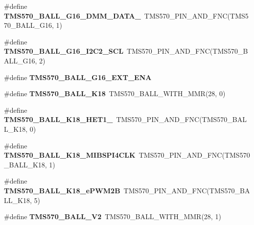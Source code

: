 \begin{DoxyCompactItemize}
\mbox{\label{tms570lc4357-pins_8h_aa8bcd263fff0731b16ca808d747d9d55}} 
\#define {\bfseries T\+M\+S570\+\_\+\+B\+A\+L\+L\+\_\+\+G16\+\_\+\+D\+M\+M\+\_\+\+D\+A\+T\+A\+\_}~T\+M\+S570\+\_\+\+P\+I\+N\+\_\+\+A\+N\+D\+\_\+\+F\+NC(T\+M\+S570\+\_\+\+B\+A\+L\+L\+\_\+\+G16, 1)
\item 
\mbox{\label{tms570lc4357-pins_8h_aedb566347e6f2cf069dab2810ea88bf5}} 
\#define {\bfseries T\+M\+S570\+\_\+\+B\+A\+L\+L\+\_\+\+G16\+\_\+\+I2\+C2\+\_\+\+S\+CL}~T\+M\+S570\+\_\+\+P\+I\+N\+\_\+\+A\+N\+D\+\_\+\+F\+NC(T\+M\+S570\+\_\+\+B\+A\+L\+L\+\_\+\+G16, 2)
\item 
\#define {\bfseries T\+M\+S570\+\_\+\+B\+A\+L\+L\+\_\+\+G16\+\_\+\+E\+X\+T\+\_\+\+E\+NA}
\item 
\mbox{\label{tms570lc4357-pins_8h_aa2e7349783370f9cca14b4fa5a86cea0}} 
\#define {\bfseries T\+M\+S570\+\_\+\+B\+A\+L\+L\+\_\+\+K18}~T\+M\+S570\+\_\+\+B\+A\+L\+L\+\_\+\+W\+I\+T\+H\+\_\+\+M\+MR(28, 0)
\item 
\mbox{\label{tms570lc4357-pins_8h_a651459dc2edee02af45c992eeb99f777}} 
\#define {\bfseries T\+M\+S570\+\_\+\+B\+A\+L\+L\+\_\+\+K18\+\_\+\+H\+E\+T1\+\_}~T\+M\+S570\+\_\+\+P\+I\+N\+\_\+\+A\+N\+D\+\_\+\+F\+NC(T\+M\+S570\+\_\+\+B\+A\+L\+L\+\_\+\+K18, 0)
\item 
\mbox{\label{tms570lc4357-pins_8h_ae0618ddeb0cd3549d0610b77cf07f23f}} 
\#define {\bfseries T\+M\+S570\+\_\+\+B\+A\+L\+L\+\_\+\+K18\+\_\+\+M\+I\+B\+S\+P\+I4\+C\+LK}~T\+M\+S570\+\_\+\+P\+I\+N\+\_\+\+A\+N\+D\+\_\+\+F\+NC(T\+M\+S570\+\_\+\+B\+A\+L\+L\+\_\+\+K18, 1)
\item 
\mbox{\label{tms570lc4357-pins_8h_ab2fa1a161a62e90b4e69e85685373dbd}} 
\#define {\bfseries T\+M\+S570\+\_\+\+B\+A\+L\+L\+\_\+\+K18\+\_\+e\+P\+W\+M2B}~T\+M\+S570\+\_\+\+P\+I\+N\+\_\+\+A\+N\+D\+\_\+\+F\+NC(T\+M\+S570\+\_\+\+B\+A\+L\+L\+\_\+\+K18, 5)
\item 
\mbox{\label{tms570lc4357-pins_8h_ac6e4e9a41dceccab962876360adc9192}} 
\#define {\bfseries T\+M\+S570\+\_\+\+B\+A\+L\+L\+\_\+\+V2}~T\+M\+S570\+\_\+\+B\+A\+L\+L\+\_\+\+W\+I\+T\+H\+\_\+\+M\+MR(28, 1)
\item 

\end{DoxyCompactItemize}
